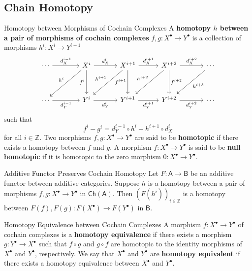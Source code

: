 \subsection{Chain Homotopy}

\begin{definition}{Homotopy between Morphisms of Cochain Complexes}{}
    A \textbf{homotopy $h$ between a pair of morphisms of cochain complexes} $f, g: X^{\bullet} \rightarrow Y^{\bullet}$ is a collection of morphisms $h^i: X^i \rightarrow Y^{i-1}$
    \[
        \begin{tikzcd}[
            ampersand replacement=\&,
            column sep={6em, between origins},
            row sep={5em, between origins}
        ]
            \cdots \arrow[r, "d_X^{i-1}"]  \& X^{i} \arrow[r, "d_X^i"] \arrow[d, "f^i"'] \arrow[ld, "h^i"'] \& X^{i+1} \arrow[d, "f^{i+1}"'] \arrow[r, "d_X^{i+1}"] \arrow[ld, "h^{i+1}"'] \& X^{i+2} \arrow[d, "f^{i+2}"] \arrow[r, "d_X^{i+2}"] \arrow[ld, "h^{i+2}"'] \& \cdots \arrow[ld, "h^{i+3}"] \\
            \cdots \arrow[r, "d_Y^{i-1}"'] \& Y^{i} \arrow[r, "d_Y^{i}"']                                   \& Y^{i+1} \arrow[r, "d_Y^{i+1}"']                                             \& Y^{i+2} \arrow[r, "d_Y^{i+2}"']                                            \& \cdots                      
        \end{tikzcd}
    \]
         such that
$$
f^i-g^i=d^{i-1}_Y \circ h^i+h^{i+1} \circ d^i_X
$$
for all $i\in \mathbb{Z}$. Two morphisms $f, g: X^{\bullet} \rightarrow Y^{\bullet}$ are said to be \textbf{homotopic} if there exists a homotopy between $f$ and $g$. A morphism $f: X^{\bullet} \rightarrow Y^{\bullet}$ is said to be \textbf{null homotopic} if it is homotopic to the zero morphism $0: X^{\bullet} \rightarrow Y^{\bullet}$.
\end{definition}


\begin{proposition}{Additive Functor Preserves Cochain Homotopy}{}
    Let $F:\mathsf{A}\to\mathsf{B}$ be an additive functor between additive categories. Suppose $h$ is a homotopy between a pair of morphisms $f, g: X^{\bullet} \rightarrow Y^{\bullet}$ in $\mathsf{Ch}(\mathsf{A})$. Then $(F(h^i))_{i\in\mathbb{Z}}$ is a homotopy between $F(f),F(g):F\left(X^{\bullet}\right)\to F\left(Y^{\bullet} \right)$ in $\mathsf{B}$.
\end{proposition}



\begin{definition}{Homotopy Equivalence between Cochain Complexes}{}
    A morphism $f: X^{\bullet} \rightarrow Y^{\bullet}$ of cochain complexes is a \textbf{homotopy equivalence} if there exists a morphism $g: Y^{\bullet} \rightarrow X^{\bullet}$ such that $f\circ g$ and $g\circ f$ are homotopic to the identity morphisms of $X^{\bullet}$ and $Y^{\bullet}$, respectively. We say that $X^{\bullet}$ and $Y^{\bullet}$ are \textbf{homotopy equivalent} if there exists a homotopy equivalence between $X^{\bullet}$ and $Y^{\bullet}$.
\end{definition}




